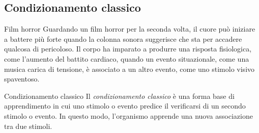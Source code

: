 \documentclass[a4paper]{article}
\begin{document}
\subsection{Condizionamento classico}
\begin{snippetexample}{Film horror}
    Guardando un film horror per la seconda volta, il cuore può iniziare a battere più forte quando la colonna sonora suggerisce che sta per accadere qualcosa di pericoloso. Il corpo ha imparato a produrre una risposta fisiologica, come l'aumento del battito cardiaco, quando un evento situazionale, come una musica carica di tensione, è associato a un altro evento, come uno stimolo visivo spaventoso.
\end{snippetexample}
\begin{snippetdefinition}{Condizionamento classico}
    Il \emph{condizionamento classico} è una forma base di apprendimento in cui uno stimolo o evento predice il verificarsi di un secondo stimolo o evento. In questo modo, l'organismo apprende una nuova associazione tra due stimoli.
\end{snippetdefinition}
\end{document}

